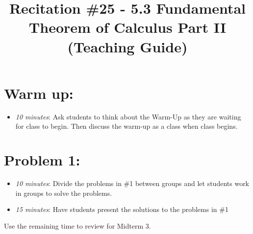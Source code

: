 \documentclass[handout,nooutcomes]{ximera}
\title{Recitation \#25 - 5.3 Fundamental Theorem of Calculus Part II (Teaching Guide)}
\begin{document}
\begin{abstract}		\end{abstract}
\maketitle


\section*{Warm up:} 
	
	\begin{itemize}
	
	\item  \emph{10 minutes}:  Ask students to think about the Warm-Up as they are waiting for class to begin.  Then discuss the warm-up as a class when class begins.
	
	
	
	\end{itemize}


\section*{Problem 1:}

	\begin{itemize}
	
	\item  \emph{10 minutes}:  Divide the problems in \#1 between groups and let students work in groups to solve the problems.
	
	\item  \emph{15 minutes}:  Have students present the solutions to the problems in \#1 
	
	\end{itemize}
	
Use the remaining time to review for Midterm 3.



	
	
	

	
	

	
	
	

	
	
	
\end{document}
